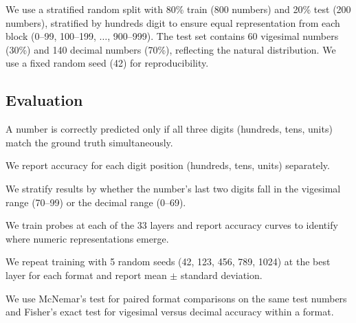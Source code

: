 We use a stratified random split with 80\% train (800 numbers) and 20\% test (200 numbers), stratified by hundreds digit to ensure equal representation from each block (0--99, 100--199, $\ldots$, 900--999). The test set contains 60 vigesimal numbers (30\%) and 140 decimal numbers (70\%), reflecting the natural distribution. We use a fixed random seed (42) for reproducibility.

\subsection{Evaluation}

 A number is correctly predicted only if all three digits (hundreds, tens, units) match the ground truth simultaneously.

 We report accuracy for each digit position (hundreds, tens, units) separately.

 We stratify results by whether the number's last two digits fall in the vigesimal range (70--99) or the decimal range (0--69).

 We train probes at each of the 33 layers and report accuracy curves to identify where numeric representations emerge.

 We repeat training with 5 random seeds (42, 123, 456, 789, 1024) at the best layer for each format and report mean $\pm$ standard deviation.

 We use McNemar's test for paired format comparisons on the same test numbers and Fisher's exact test for vigesimal versus decimal accuracy within a format.
